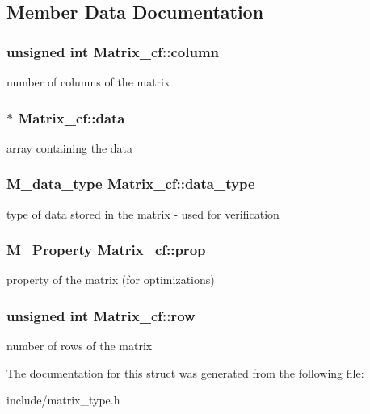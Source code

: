 \subsection{Member Data Documentation}
\subsubsection[{\texorpdfstring{column}{column}}]{\setlength{\rightskip}{0pt plus 5cm}unsigned int Matrix\+\_\+cf\+::column}\hypertarget{structMatrix__cf_ac0522815facf90db76974c3db9645927}{}\label{structMatrix__cf_ac0522815facf90db76974c3db9645927}
number of columns of the matrix 
\subsubsection[{\texorpdfstring{data}{data}}]{$\ast$ Matrix\+\_\+cf\+::data}\hypertarget{structMatrix__cf_a987beffa87c0ed47d1c7b23159c8fd31}{}\label{structMatrix__cf_a987beffa87c0ed47d1c7b23159c8fd31}
array containing the data 
\subsubsection[{\texorpdfstring{data\+\_\+type}{data_type}}]{\setlength{\rightskip}{0pt plus 5cm}M\+\_\+data\+\_\+type Matrix\+\_\+cf\+::data\+\_\+type}\hypertarget{structMatrix__cf_a93b82c3bbbc41c942eaa7891944a1015}{}\label{structMatrix__cf_a93b82c3bbbc41c942eaa7891944a1015}
type of data stored in the matrix -\/ used for verification 
\subsubsection[{\texorpdfstring{prop}{prop}}]{\setlength{\rightskip}{0pt plus 5cm}M\+\_\+\+Property Matrix\+\_\+cf\+::prop}\hypertarget{structMatrix__cf_ae5e94ddc0ac8bd8bebfed98f3da07484}{}\label{structMatrix__cf_ae5e94ddc0ac8bd8bebfed98f3da07484}
property of the matrix (for optimizations) 
\subsubsection[{\texorpdfstring{row}{row}}]{\setlength{\rightskip}{0pt plus 5cm}unsigned int Matrix\+\_\+cf\+::row}\hypertarget{structMatrix__cf_a78fd97baf2f96f5277a90752322fd5a0}{}\label{structMatrix__cf_a78fd97baf2f96f5277a90752322fd5a0}
number of rows of the matrix 

The documentation for this struct was generated from the following file\+:\begin{DoxyCompactItemize}
\item 
include/matrix\+\_\+type.\+h\end{DoxyCompactItemize}
